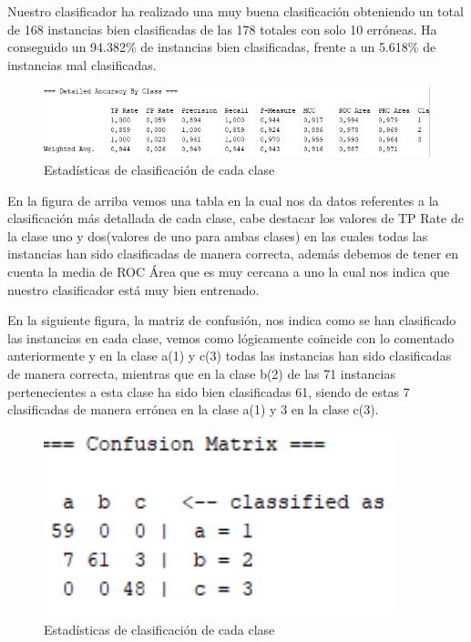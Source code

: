 Nuestro clasificador ha realizado una muy buena clasificación obteniendo un total de 168 instancias bien clasificadas de las 178 totales con solo 10 erróneas.
Ha conseguido un 94.382\% de instancias bien clasificadas, frente a un 5.618\% de instancias mal clasificadas.

\begin{figure}[H]
    \centering
    \includegraphics[width=\textwidth]{img/Ebyclass.PNG}
    \caption{Estadísticas de clasificación de cada clase}
\end{figure}

En la figura de arriba vemos una tabla en la cual nos da datos referentes a la clasificación más detallada de cada clase, cabe destacar los valores de TP Rate de la clase uno y dos(valores de uno para ambas clases) en  las cuales todas las instancias han sido clasificadas de manera correcta, además debemos de tener en cuenta la media de ROC Área que es muy cercana a uno la cual nos indica que nuestro clasificador está muy bien entrenado.

En la siguiente figura, la matriz de confusión, nos indica como se han clasificado las instancias en cada clase, vemos como lógicamente coincide con lo comentado anteriormente y en la clase a(1) y c(3) todas las instancias han sido clasificadas de manera correcta, mientras que en la clase b(2) de las 71 instancias pertenecientes a esta clase ha sido bien clasificadas 61, siendo de estas 7 clasificadas de manera errónea en la clase a(1) y 3 en la clase c(3).

\begin{figure}[H]
    \centering
    \includegraphics[width=0.9\textwidth]{img/MConf.PNG}
    \caption{Estadísticas de clasificación de cada clase}
\end{figure}


